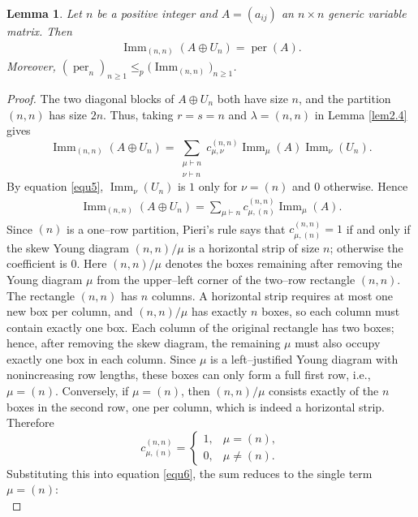 \documentclass[11pt,a4paper]{article}
\newtheorem{lemma}[theorem]{Lemma}
\begin{document}
\begin{lemma}\label{lem2.5}
Let $n$ be a positive integer and $A=(a_{ij})$ an $n\times n$ generic variable matrix. Then
\begin{eqnarray*}
  \operatorname{Imm}_{(n,n)}(A\oplus U_n)=\operatorname{per}(A).
\end{eqnarray*}
Moreover, $(\operatorname{per}_n)_{n\geq1}\leq_p\bigl(\operatorname{Imm}_{(n,n)}\bigr)_{n\geq1}$.
\end{lemma}

\begin{proof}
The two diagonal blocks of $A\oplus U_n$ both have size $n$, and the partition $(n,n)$ has size $2n$. Thus, taking $r=s=n$ and $\lambda=(n,n)$ in Lemma \ref{lem2.4} gives
\[
  \operatorname{Imm}_{(n,n)}(A\oplus U_n)
  =\sum_{\substack{\mu\vdash n\\\nu\vdash n}}
    c_{\mu,\nu}^{(n,n)}\operatorname{Imm}_\mu(A)\operatorname{Imm}_\nu(U_n).
\]
By equation \eqref{equ5}, $\operatorname{Imm}_\nu(U_n)$ is $1$ only for $\nu=(n)$ and $0$ otherwise. Hence
\begin{eqnarray}\label{equ6}
  \operatorname{Imm}_{(n,n)}(A\oplus U_n)
  =\sum_{\mu\vdash n}c_{\mu,(n)}^{(n,n)}\operatorname{Imm}_\mu(A).
\end{eqnarray}
Since $(n)$ is a one–row partition, Pieri's rule says that $c_{\mu,(n)}^{(n,n)}=1$ if and only if the skew Young diagram $(n,n)/\mu$ is a horizontal strip of size $n$; otherwise the coefficient is $0$. Here $(n,n)/\mu$ denotes the boxes remaining after removing the Young diagram $\mu$ from the upper–left corner of the two–row rectangle $(n,n)$. The rectangle $(n,n)$ has $n$ columns. A horizontal strip requires at most one new box per column, and $(n,n)/\mu$ has exactly $n$ boxes, so each column must contain exactly one box. Each column of the original rectangle has two boxes; hence, after removing the skew diagram, the remaining $\mu$ must also occupy exactly one box in each column. Since $\mu$ is a left–justified Young diagram with nonincreasing row lengths, these boxes can only form a full first row, i.e., $\mu=(n)$. Conversely, if $\mu=(n)$, then $(n,n)/\mu$ consists exactly of the $n$ boxes in the second row, one per column, which is indeed a horizontal strip. Therefore
\[
  c_{\mu,(n)}^{(n,n)}=\begin{cases}
    1,&\mu=(n),\\
    0,&\mu\ne(n).
  \end{cases}
\]
Substituting this into equation \eqref{equ6}, the sum reduces to the single term $\mu=(n)$:
\[
\]
\end{proof}
\end{document}
